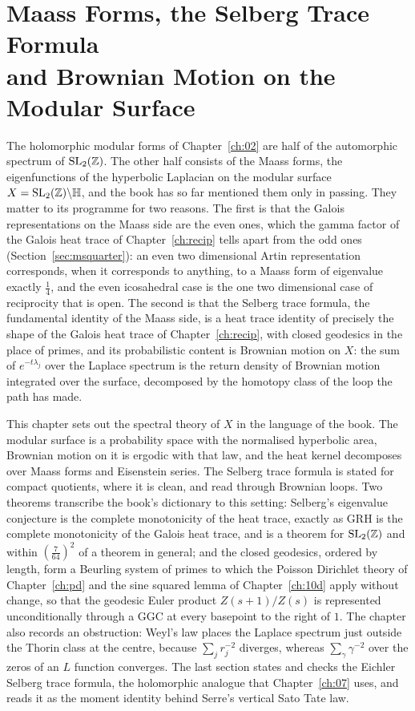 \chapter[Maass Forms and Brownian Motion]{Maass Forms, the Selberg Trace Formula\\ and Brownian Motion on the Modular Surface}\label{ch:maass}

The holomorphic modular forms of Chapter~\ref{ch:02} are half of the automorphic spectrum of $\mathrm{SL}_2(\mathbb{Z})$. The other half consists of the Maass forms, the eigenfunctions of the hyperbolic Laplacian on the modular surface $X=\mathrm{SL}_2(\mathbb{Z})\backslash\mathbb H$, and the book has so far mentioned them only in passing. They matter to its programme for two reasons. The first is that the Galois representations on the Maass side are the even ones, which the gamma factor of the Galois heat trace of Chapter~\ref{ch:recip} tells apart from the odd ones (Section~\ref{sec:msquarter}): an even two dimensional Artin representation corresponds, when it corresponds to anything, to a Maass form of eigenvalue exactly $\frac14$, and the even icosahedral case is the one two dimensional case of reciprocity that is open. The second is that the Selberg trace formula, the fundamental identity of the Maass side, is a heat trace identity of precisely the shape of the Galois heat trace of Chapter~\ref{ch:recip}, with closed geodesics in the place of primes, and its probabilistic content is Brownian motion on $X$: the sum of $e^{-t\lambda_j}$ over the Laplace spectrum is the return density of Brownian motion integrated over the surface, decomposed by the homotopy class of the loop the path has made.

This chapter sets out the spectral theory of $X$ in the language of the book. The modular surface is a probability space with the normalised hyperbolic area, Brownian motion on it is ergodic with that law, and the heat kernel decomposes over Maass forms and Eisenstein series. The Selberg trace formula is stated for compact quotients, where it is clean, and read through Brownian loops. Two theorems transcribe the book's dictionary to this setting: Selberg's eigenvalue conjecture is the complete monotonicity of the heat trace, exactly as GRH is the complete monotonicity of the Galois heat trace, and is a theorem for $\mathrm{SL}_2(\mathbb{Z})$ and within $(\frac7{64})^2$ of a theorem in general; and the closed geodesics, ordered by length, form a Beurling system of primes to which the Poisson Dirichlet theory of Chapter~\ref{ch:pd} and the sine squared lemma of Chapter~\ref{ch:10d} apply without change, so that the geodesic Euler product $Z(s+1)/Z(s)$ is represented unconditionally through a GGC at every basepoint to the right of $1$. The chapter also records an obstruction: Weyl's law places the Laplace spectrum just outside the Thorin class at the centre, because $\sum_j r_j^{-2}$ diverges, whereas $\sum_\gamma\gamma^{-2}$ over the zeros of an $L$ function converges. The last section states and checks the Eichler Selberg trace formula, the holomorphic analogue that Chapter~\ref{ch:07} uses, and reads it as the moment identity behind Serre's vertical Sato Tate law.

